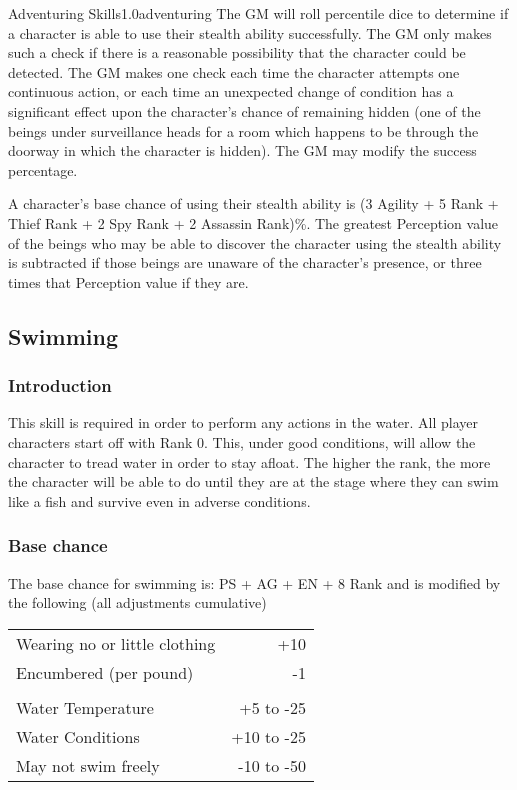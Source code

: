 \begin{skill}{Adventuring Skills}{1.0}{adventuring}
The GM will roll percentile dice to determine if a character is able
to use their stealth ability successfully.  The GM only makes such a
check if there is a reasonable possibility that the character could be
detected.  The GM makes one check each time the character attempts one
continuous action, or each time an unexpected change of condition has
a significant effect upon the character's chance of remaining hidden
(\eg one of the beings under surveillance heads for a room which
happens to be through the doorway in which the character is hidden).
The GM may modify the success percentage.

A character's base chance of using their stealth ability is (3 \x
Agility + 5 \x Rank + Thief Rank + 2 \x Spy Rank + 2 \x Assassin
Rank)\%.  The greatest Perception value of the beings who may be able
to discover the character using the stealth ability is subtracted if
those beings are unaware of the character's presence, or three times
that Perception value if they are.


\subsection{Swimming}
\label{swimming}

\subsubsection{Introduction}
This skill is required in order to perform any actions in the water.
All player characters start off with Rank 0. This, under good
conditions, will allow the character to tread water in order to stay
afloat. The higher the rank, the more the character will be able to do
until they are at the stage where they can swim like a fish and
survive even in adverse conditions.

\subsubsection{Base chance}

The base chance for swimming is: PS + AG + EN + 8 \x Rank and is
modified by the following (all adjustments cumulative)

\begin{tabularx}{\linewidth}{Xr}
Wearing no or little clothing		& +10 \\
Encumbered (per pound)			& -1 \\
\\
Water Temperature			& +5 to -25 \\
Water Conditions			& +10 to -25 \\
May not swim freely			& -10 to -50 \\
\end{tabularx}


\end{skill}
